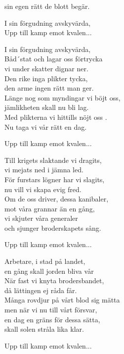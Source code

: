 sin egen rätt de blott begär.\par
\vspace{10pt}
I sin förgudning avskyvärda,\\
Upp till kamp emot kvalen...\par
\vspace{10pt}
I sin förgudning avskyvärda,\\
Båd´stat och lagar oss förtrycka\\
vi under skatter dignar ner.\\
Den rike inga plikter tycka,\\
den arme ingen rätt man ger.\\
Länge nog som myndingar vi böjt oss,\\
jämlikheten skall nu bli lag.\\
Med plikterna vi hittills nöjt oss .\\
Nu taga vi vår rätt en dag.\par
\vspace{10pt}
Upp till kamp emot kvalen...\par
\vspace{10pt}
Till krigets slaktande vi dragits,\\
vi mejats ned i jämna led.\\
För furstars lögner har vi slagits,\\
nu vill vi skapa evig fred.\\
Om de oss driver, dessa kanibaler,\\
mot våra grannar än en gång,\\
vi skjuter våra generaler\\
och sjunger broderskapets sång.\par
\vspace{10pt}
Upp till kamp emot kvalen...\par
\vspace{10pt}
Arbetare, i stad på landet,\\
en gång skall jorden bliva vår\\
När fast vi knyta brodersbandet,\\
då lättingen ej råda får.\\
Många rovdjur på vårt blod sig mätta\\
men när vi nu till vårt försvar,\\
en dag en gräns för dessa sätta,\\
skall solen stråla lika klar.\par
\vspace{10pt}
Upp till kamp emot kvalen...
